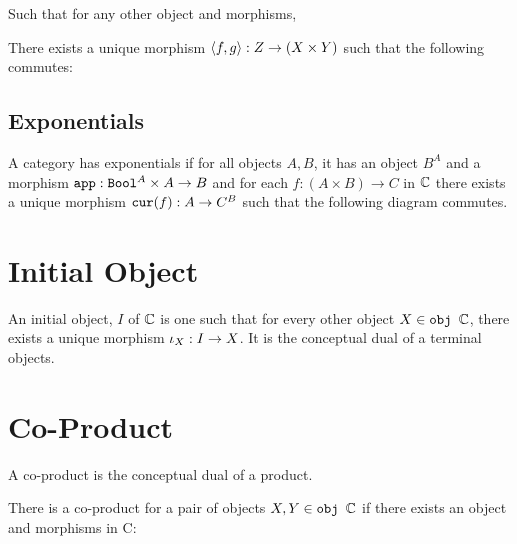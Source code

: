 \documentclass{Report}
\begin{document}
Such that for any other object and morphisms,


There exists a unique morphism $\left\langle f, g\right\rangle: Z \rightarrow (X\times Y)$ such that the following commutes:


\subsection{Exponentials}
A category has exponentials if for all objects $A, B$, it has an object $B^A$ and a morphism $\texttt{app}: \texttt{Bool}^A \times A \rightarrow B$ and for each $f: (A\times B)\rightarrow C$ in $\mathbb{C}$ there exists a unique morphism $\texttt{cur}(f): A \rightarrow C^B$ such that the following diagram commutes.


\section{Initial Object}

An initial object, $I$ of $\mathbb{C}$ is one such that for every other object $X\in\texttt{obj }\mathbb{C}$, there exists a unique morphism $\iota_X: I\rightarrow X$. It is the conceptual dual of a terminal objects.

\section{Co-Product}
A co-product is the conceptual dual of a product.

There is a co-product for a pair of objects $X, Y\in\texttt{obj }\mathbb{C}$ if there exists an object and morphisms in C:
\end{document}
